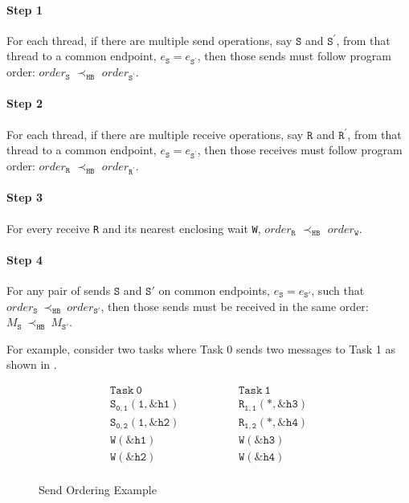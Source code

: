 \paragraph*{Step 1} For each thread, if there are multiple send
operations, say $\mathtt{S}$ and $\mathtt{S^\prime}$, from that thread
to a common endpoint, $e_\mathtt{S} = e_\mathtt{S^\prime}$, then those
sends must follow program order: $\mathit{order}_\mathtt{S}$
$\prec_\mathtt{HB}$ $\mathit{order}_\mathtt{S^\prime}$.

\paragraph*{Step 2} For each thread, if there are multiple receive
operations, say $\mathtt{R}$ and $\mathtt{R^\prime}$, from that thread
to a common endpoint, $e_\mathtt{S} = e_\mathtt{S^\prime}$, then those
receives must follow program order: $\mathit{order}_\mathtt{R}$
$\prec_\mathtt{HB}$ $\mathit{order}_\mathtt{R^\prime}$.

\paragraph*{Step 3} For every receive \texttt{R} and its nearest
enclosing wait \texttt{W}, $\mathit{order}_\mathtt{R}$
$\prec_\mathtt{HB}$ $\mathit{order}_\mathtt{W}$.

\paragraph*{Step 4} For any pair of sends $\mathtt{S}$ and
$\mathtt{S'}$ on common endpoints, $e_{\mathtt{S}}=e_{\mathtt{S'}}$,
such that
$\mathit{order}_\mathtt{S}\ \mathrm{\prec_\mathtt{HB}}\ \mathit{order}_\mathtt{S'}$,
then those sends must be received in the same order:
$M_{\mathtt{S}}\ \mathrm{\prec_{\mathtt{HB}}}\ M_{\mathtt{S'}}$.

For example, consider two tasks where Task 0 sends two messages to
Task 1 as shown in .

\begin{figure}[h]
\[
\begin{array}{l|l}
\;\;\;\;\;\;\;\;\mathtt{Task\ 0}\;\;\;\;\;\;\;\; & \;\;\;\;\;\;\;\; \mathtt{Task\ 1}\;\;\;\;\;\;\;\; \\
\hline
\;\;\;\;\;\;\;\;\mathtt{S_{0,1}(1,\&h1)}\;\;\;\;\;\;\;\; & \;\;\;\;\;\;\;\; \mathtt{R_{1,1}(*,\&h3)}\;\;\;\;\;\;\;\; \\
\;\;\;\;\;\;\;\;\mathtt{S_{0,2}(1,\&h2)}\;\;\;\;\;\;\;\; & \;\;\;\;\;\;\;\; \mathtt{R_{1,2}(*,\&h4)}\;\;\;\;\;\;\;\; \\
\;\;\;\;\;\;\;\;\mathtt{W(\&h1)}\;\;\;\;\;\;\;\; & \;\;\;\;\;\;\;\; \mathtt{W(\&h3)}\;\;\;\;\;\;\;\; \\
\;\;\;\;\;\;\;\;\mathtt{W(\&h2)}\;\;\;\;\;\;\;\; & \;\;\;\;\;\;\;\; \mathtt{W(\&h4)}\;\;\;\;\;\;\;\; \\
\end{array}
\]
\caption{Send Ordering Example} \label{fig:step4}
\end{figure}

